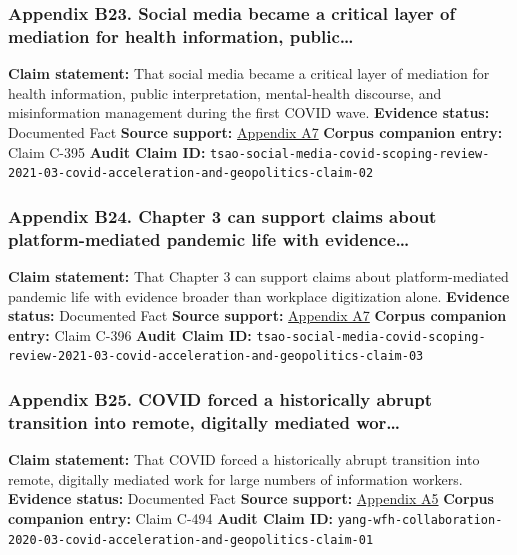\documentclass[
  american,
  11pt,
  letterpaper,
]{article}
\begin{document}
\subsubsection{Appendix B23. Social media became a critical layer of
mediation for health information,
public\ldots{}}\label{appendix-b23-social-media-became-a-critical-layer-of-mediation-for-health-information-public}

\textbf{Claim statement:} That social media became a critical layer of
mediation for health information, public interpretation, mental-health
discourse, and misinformation management during the first COVID wave.
\textbf{Evidence status:} Documented Fact \textbf{Source support:}
\hyperref[appendix-a7-what-social-media-told-about-us-in-the-time-of-covid-19-a-scoping-review]{Appendix
A7} \textbf{Corpus companion entry:} Claim C-395 \textbf{Audit Claim
ID:}
\texttt{tsao-social-media-covid-scoping-review-2021-03-covid-acceleration-and-geopolitics-claim-02}

\subsubsection{Appendix B24. Chapter 3 can support claims about
platform-mediated pandemic life with
evidence\ldots{}}\label{appendix-b24-chapter-3-can-support-claims-about-platform-mediated-pandemic-life-with-evidence}

\textbf{Claim statement:} That Chapter 3 can support claims about
platform-mediated pandemic life with evidence broader than workplace
digitization alone. \textbf{Evidence status:} Documented Fact
\textbf{Source support:}
\hyperref[appendix-a7-what-social-media-told-about-us-in-the-time-of-covid-19-a-scoping-review]{Appendix
A7} \textbf{Corpus companion entry:} Claim C-396 \textbf{Audit Claim
ID:}
\texttt{tsao-social-media-covid-scoping-review-2021-03-covid-acceleration-and-geopolitics-claim-03}

\subsubsection{Appendix B25. COVID forced a historically abrupt
transition into remote, digitally mediated
wor\ldots{}}\label{appendix-b25-covid-forced-a-historically-abrupt-transition-into-remote-digitally-mediated-wor}

\textbf{Claim statement:} That COVID forced a historically abrupt
transition into remote, digitally mediated work for large numbers of
information workers. \textbf{Evidence status:} Documented Fact
\textbf{Source support:}
\hyperref[appendix-a5-how-work-from-home-affects-collaboration-a-large-scale-study-of-information-workers-in-a-natural-experiment-during-covid-19]{Appendix
A5} \textbf{Corpus companion entry:} Claim C-494 \textbf{Audit Claim
ID:}
\texttt{yang-wfh-collaboration-2020-03-covid-acceleration-and-geopolitics-claim-01}
\end{document}
